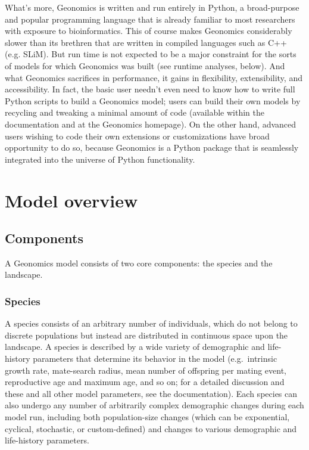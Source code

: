 ﻿\documentclass{article}
\begin{document}
What's more, Geonomics is written and run entirely in Python, a broad-purpose and popular
programming language that is already familiar to most researchers with exposure to bioinformatics.
This of course makes Geonomics considerably slower than its brethren that are
written in compiled languages such as C++ (e.g. SLiM). 
But run time is not expected to be a major constraint for the sorts of models
for which Geonomics was built (see runtime analyses, below). 
And what Geonomics sacrifices in performance, it gains in flexibility, extensibility, and accessibility.
In fact, the basic user needn't even need to know how to write full Python scripts to 
build a Geonomics model; users can build their own models by recycling and tweaking
a minimal amount of code (available within the documentation and at the Geonomics homepage).
On the other hand, advanced users wishing to code their own extensions or customizations
have broad opportunity to do so, because Geonomics is a Python package that is seamlessly
integrated into the universe of Python functionality.


\section{Model overview}

\subsection{Components}
A Geonomics model consists of two core components: the species and the landscape.

\subsubsection{Species}
A species consists of an arbitrary number of individuals, which do not belong to
discrete populations but instead are distributed in continuous space upon the landscape.
A species is described by a wide variety of demographic and life-history parameters
that determine its behavior in the model (e.g.\ intrinsic growth rate, mate-search radius,
mean number of offspring per mating event, reproductive age and maximum age, and so on;
for a detailed discussion and these and all other model parameters, see the documentation).
Each species can also undergo any number of arbitrarily complex demographic changes during
each model run, including both population-size changes
(which can be exponential, cyclical, stochastic, or custom-defined)
and changes to various demographic and life-history parameters.
\end{document}

